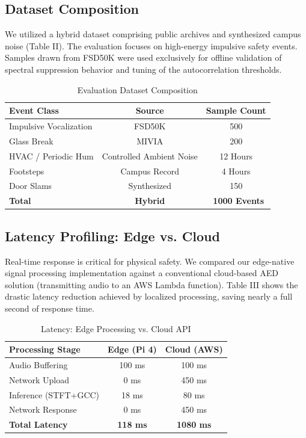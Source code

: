 \documentclass[conference]{IEEEtran}
\begin{document}
\subsection{Dataset Composition}
We utilized a hybrid dataset comprising public archives and synthesized campus noise (Table II). The evaluation focuses on high-energy impulsive safety events. Samples drawn from FSD50K were used exclusively for offline validation of spectral suppression behavior and tuning of the autocorrelation thresholds.

\begin{table}[htbp]
\caption{Evaluation Dataset Composition}
\begin{center}
\begin{tabular}{lcc}
\toprule
\textbf{Event Class} & \textbf{Source} & \textbf{Sample Count} \\
\midrule
Impulsive Vocalization & FSD50K \cite{b19} & 500 \\
Glass Break & MIVIA & 200 \\
HVAC / Periodic Hum & Controlled Ambient Noise & 12 Hours \\
Footsteps & Campus Record & 4 Hours \\
Door Slams & Synthesized & 150 \\
\textbf{Total} & \textbf{Hybrid} & \textbf{~1000 Events} \\
\bottomrule
\end{tabular}
\end{center}
\label{tab:dataset}
\end{table}

\subsection{Latency Profiling: Edge vs. Cloud}
Real-time response is critical for physical safety. We compared our edge-native signal processing implementation against a conventional cloud-based AED solution (transmitting audio to an AWS Lambda function). Table III shows the drastic latency reduction achieved by localized processing, saving nearly a full second of response time.

\begin{table}[htbp]
\caption{Latency: Edge Processing vs. Cloud API}
\begin{center}
\begin{tabular}{lcc}
\toprule
\textbf{Processing Stage} & \textbf{Edge (Pi 4)} & \textbf{Cloud (AWS)} \\
\midrule
Audio Buffering & 100 ms & 100 ms \\
Network Upload & 0 ms & 450 ms \\
Inference (STFT+GCC) & 18 ms & 80 ms \\
Network Response & 0 ms & 450 ms \\
\textbf{Total Latency} & \textbf{118 ms} & \textbf{1080 ms} \\
\bottomrule
\end{tabular}
\end{center}
\label{tab:latency}
\end{table}
\end{document}
